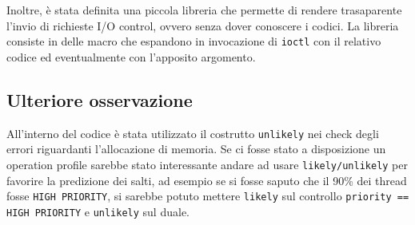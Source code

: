 \documentclass[oneside]{article}
\begin{document}
Inoltre, è stata definita una piccola libreria che permette di rendere trasaparente l'invio di richieste I/O control, ovvero senza dover conoscere i codici. La libreria consiste in delle macro che espandono in invocazione di \texttt{ioctl} con il relativo codice ed eventualmente con l'apposito argomento.

\subsection{Ulteriore osservazione}
All'interno del codice è stata utilizzato il costrutto \texttt{unlikely} nei check degli errori riguardanti l'allocazione di memoria. Se ci fosse stato a disposizione un operation profile sarebbe stato interessante andare ad usare \texttt{likely/unlikely} per favorire la predizione dei salti, ad esempio se si fosse saputo che il 90\% dei thread fosse \texttt{HIGH PRIORITY}, si sarebbe potuto mettere \texttt{likely} sul controllo \texttt{priority == HIGH PRIORITY} e \texttt{unlikely} sul duale.
\end{document}
